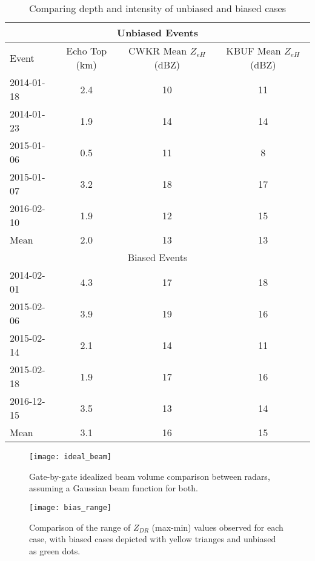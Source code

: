 \begin{table}[H]
    \caption{Comparing depth and intensity of unbiased and biased cases}\label{diagnosebias}
    \begin{center}
    \begin{tabular}{|l|c|c|c|}
    \hline
    \multicolumn{4}{|c|}{Unbiased Events} \\
    \hline
     Event & Echo Top (km) & CWKR Mean $Z_{eH}$ (dBZ) & KBUF Mean $Z_{eH}$ (dBZ)\\
    \hline\hline
    2014-01-18 & 2.4 & 10 & 11 \\
    \hline
    2014-01-23 & 1.9 & 14 & 14 \\
    \hline
    2015-01-06 & 0.5 & 11 & 8 \\
    \hline
    2015-01-07 & 3.2 & 18 & 17 \\ 
    \hline
    2016-02-10 & 1.9 & 12 & 15 \\ 
    \hline\hline
    Mean & 2.0 & 13 & 13\\
    \hline
    \multicolumn{4}{|c|}{Biased Events} \\
    \hline\hline
    2014-02-01 & 4.3 & 17 & 18\\
    \hline
    2015-02-06 & 3.9 & 19 & 16\\
    \hline
    2015-02-14 & 2.1 & 14 & 11\\
    \hline
    2015-02-18 & 1.9 & 17 & 16\\ 
    \hline
    2016-12-15 & 3.5 & 13 & 14  \\ 
    \hline\hline
    Mean & 3.1 & 16 & 15 \\
    \hline
    \end{tabular}
    \end{center}
\end{table}
\begin{figure}[H]
\texttt{[image: ideal\_beam]}
\caption{Gate-by-gate idealized beam volume comparison between radars, assuming a Gaussian beam function for both.} 
\label{fig:ideal_beam}
\end{figure}

\begin{figure}[H]
\texttt{[image: bias\_range]}
\caption{Comparison of the range of $Z_{DR}$ (max-min) values observed for each case, with biased cases depicted with yellow trianges and unbiased as green dots.} 
\label{fig:bias_range}
\end{figure}
